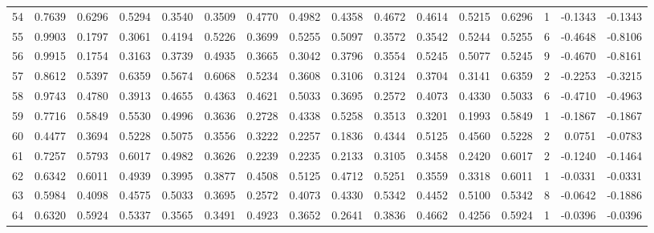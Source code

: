 \begin{tabular}{lrrrrrrrrrrrrrrr}
54  &      0.7639 &  0.6296 &  0.5294 &  0.3540 &  0.3509 &  0.4770 &  0.4982 &  0.4358 &  0.4672 &  0.4614 &   0.5215 &     0.6296 &      1 &                   -0.1343 &                    -0.1343 \\
55  &      0.9903 &  0.1797 &  0.3061 &  0.4194 &  0.5226 &  0.3699 &  0.5255 &  0.5097 &  0.3572 &  0.3542 &   0.5244 &     0.5255 &      6 &                   -0.4648 &                    -0.8106 \\
56  &      0.9915 &  0.1754 &  0.3163 &  0.3739 &  0.4935 &  0.3665 &  0.3042 &  0.3796 &  0.3554 &  0.5245 &   0.5077 &     0.5245 &      9 &                   -0.4670 &                    -0.8161 \\
57  &      0.8612 &  0.5397 &  0.6359 &  0.5674 &  0.6068 &  0.5234 &  0.3608 &  0.3106 &  0.3124 &  0.3704 &   0.3141 &     0.6359 &      2 &                   -0.2253 &                    -0.3215 \\
58  &      0.9743 &  0.4780 &  0.3913 &  0.4655 &  0.4363 &  0.4621 &  0.5033 &  0.3695 &  0.2572 &  0.4073 &   0.4330 &     0.5033 &      6 &                   -0.4710 &                    -0.4963 \\
59  &      0.7716 &  0.5849 &  0.5530 &  0.4996 &  0.3636 &  0.2728 &  0.4338 &  0.5258 &  0.3513 &  0.3201 &   0.1993 &     0.5849 &      1 &                   -0.1867 &                    -0.1867 \\
60  &      0.4477 &  0.3694 &  0.5228 &  0.5075 &  0.3556 &  0.3222 &  0.2257 &  0.1836 &  0.4344 &  0.5125 &   0.4560 &     0.5228 &      2 &                    0.0751 &                    -0.0783 \\
61  &      0.7257 &  0.5793 &  0.6017 &  0.4982 &  0.3626 &  0.2239 &  0.2235 &  0.2133 &  0.3105 &  0.3458 &   0.2420 &     0.6017 &      2 &                   -0.1240 &                    -0.1464 \\
62  &      0.6342 &  0.6011 &  0.4939 &  0.3995 &  0.3877 &  0.4508 &  0.5125 &  0.4712 &  0.5251 &  0.3559 &   0.3318 &     0.6011 &      1 &                   -0.0331 &                    -0.0331 \\
63  &      0.5984 &  0.4098 &  0.4575 &  0.5033 &  0.3695 &  0.2572 &  0.4073 &  0.4330 &  0.5342 &  0.4452 &   0.5100 &     0.5342 &      8 &                   -0.0642 &                    -0.1886 \\
64  &      0.6320 &  0.5924 &  0.5337 &  0.3565 &  0.3491 &  0.4923 &  0.3652 &  0.2641 &  0.3836 &  0.4662 &   0.4256 &     0.5924 &      1 &                   -0.0396 &                    -0.0396 \\

\end{tabular}
